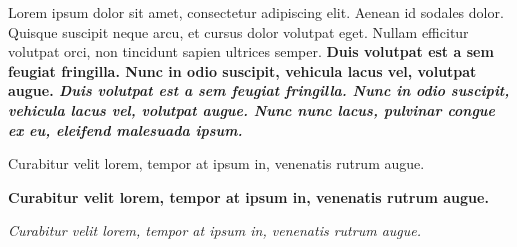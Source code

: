 \begindoc
    Lorem ipsum dolor sit amet, consectetur adipiscing elit. Aenean id sodales dolor.
    \linebreak
    Quisque suscipit neque arcu, et cursus dolor volutpat eget. Nullam efficitur volutpat orci, non tincidunt sapien ultrices semper.
    \bf{Duis volutpat est a sem feugiat fringilla. Nunc in odio suscipit, vehicula lacus vel, volutpat augue.}
    \it{Duis volutpat est a sem feugiat fringilla. Nunc in odio suscipit, vehicula lacus vel, volutpat augue.}
    \linebreak
    \it{Nunc nunc lacus, pulvinar congue ex eu, eleifend malesuada ipsum.}
    \linebreak
    \beginenum
        \item Curabitur velit lorem, tempor at ipsum in, venenatis rutrum augue.
        \item \bf{Curabitur velit lorem, tempor at ipsum in, venenatis rutrum augue.}
        \item \it{Curabitur velit lorem, tempor at ipsum in, venenatis rutrum augue.}
        \item \linebreak
    \endenum
    \linebreak
    \linebreak
\enddoc
